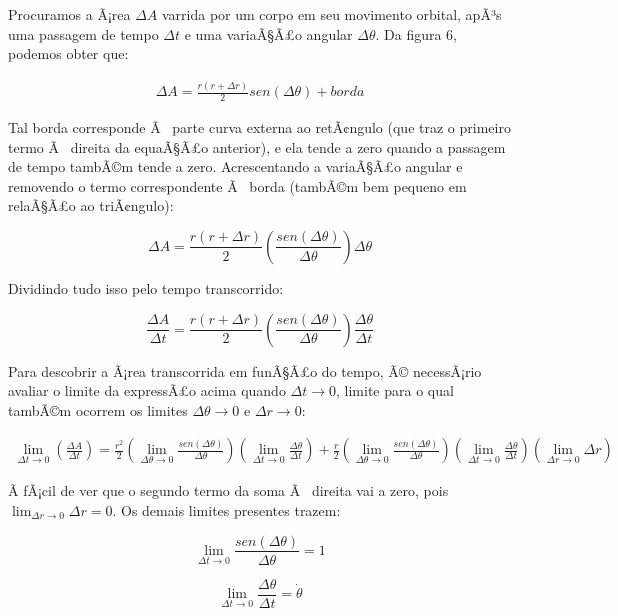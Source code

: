 Procuramos a Ã¡rea $\Delta A$ varrida por um corpo em seu movimento orbital, apÃ³s uma passagem de tempo $\Delta t$ e uma variaÃ§Ã£o angular $\Delta \theta$. Da figura 6, podemos obter que:

\begin{eqnarray}
	\Delta A = \frac{r(r+\Delta r)}{2}sen(\Delta \theta) + borda\label{eq53}
\end{eqnarray}

Tal borda corresponde Ã  parte curva externa ao retÃ¢ngulo (que traz o primeiro termo Ã  direita da equaÃ§Ã£o anterior), e ela tende a zero quando a passagem de tempo tambÃ©m tende a zero. Acrescentando a variaÃ§Ã£o angular e removendo o termo correspondente Ã  borda (tambÃ©m bem pequeno em relaÃ§Ã£o ao triÃ¢ngulo):

\[
	\Delta A = \frac{r(r+\Delta r)}{2}\left(\frac{sen(\Delta \theta)}{\Delta \theta}\right)\Delta \theta
\]

Dividindo tudo isso pelo tempo transcorrido:

\[
    \frac{\Delta A}{\Delta t} = \frac{r(r+\Delta r)}{2}\left(\frac{sen(\Delta \theta)}{\Delta \theta}\right)\frac{\Delta \theta}{\Delta t}
\]

Para descobrir a Ã¡rea transcorrida em funÃ§Ã£o do tempo, Ã© necessÃ¡rio avaliar o limite da expressÃ£o acima quando $\Delta t \rightarrow 0$, limite para o qual tambÃ©m ocorrem os limites $\Delta \theta \rightarrow 0$ e $\Delta r \rightarrow 0$:

\begin{eqnarray}
	 \lim_{\Delta t \rightarrow 0}\left({\frac{\Delta A}{\Delta t}}\right) = \frac{r^2}{2}\left(\lim_{\Delta \theta \rightarrow 0}{\frac{sen(\Delta \theta)}{\Delta \theta}}\right)\left(\lim_{\Delta t \rightarrow 0}{\frac{\Delta \theta}{\Delta t}}\right) + \frac{r}{2}\left(\lim_{\Delta \theta \rightarrow 0}{\frac{sen(\Delta \theta)}{\Delta \theta}}\right)\left(\lim_{\Delta t \rightarrow 0}{\frac{\Delta \theta}{\Delta t}}\right)\left(\lim_{\Delta r \rightarrow 0}{\Delta r}\right) \label{eq54}
\end{eqnarray}

Ã fÃ¡cil de ver que o segundo termo da soma Ã  direita vai a zero, pois $\lim_{\Delta r \rightarrow 0}{\Delta r} = 0$. Os demais limites presentes trazem:

\[
	\lim_{\Delta t \rightarrow 0}{\frac{sen(\Delta \theta)}{\Delta \theta}} = 1
\]

\[
	\lim_{\Delta t \rightarrow 0}{\frac{\Delta \theta}{\Delta t}} = \dot{\theta}
\]

